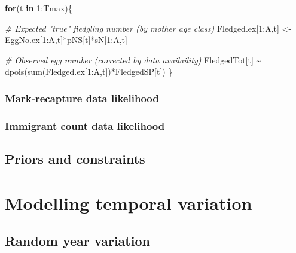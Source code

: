 \documentclass[
]{book}
\newenvironment{Shaded}{\begin{snugshade}}{\end{snugshade}}
\newcommand{\CommentTok}[1]{\textcolor[rgb]{0.56,0.35,0.01}{\textit{#1}}}
\newcommand{\ControlFlowTok}[1]{\textcolor[rgb]{0.13,0.29,0.53}{\textbf{#1}}}
\newcommand{\DecValTok}[1]{\textcolor[rgb]{0.00,0.00,0.81}{#1}}
\newcommand{\FunctionTok}[1]{\textcolor[rgb]{0.00,0.00,0.00}{#1}}
\newcommand{\NormalTok}[1]{#1}
\newcommand{\OtherTok}[1]{\textcolor[rgb]{0.56,0.35,0.01}{#1}}
\newcommand{\SpecialCharTok}[1]{\textcolor[rgb]{0.00,0.00,0.00}{#1}}
\begin{document}
\begin{Shaded}
\begin{Highlighting}[]
\ControlFlowTok{for}\NormalTok{(t }\ControlFlowTok{in} \DecValTok{1}\SpecialCharTok{:}\NormalTok{Tmax)\{}

    \CommentTok{\# Expected "true" fledgling number (by mother age class)}
\NormalTok{    Fledged.ex[}\DecValTok{1}\SpecialCharTok{:}\NormalTok{A,t] }\OtherTok{\textless{}{-}}\NormalTok{ EggNo.ex[}\DecValTok{1}\SpecialCharTok{:}\NormalTok{A,t]}\SpecialCharTok{*}\NormalTok{pNS[t]}\SpecialCharTok{*}\NormalTok{sN[}\DecValTok{1}\SpecialCharTok{:}\NormalTok{A,t]}

    \CommentTok{\# Observed egg number (corrected by data availaility)}
\NormalTok{    FledgedTot[t] }\SpecialCharTok{\textasciitilde{}} \FunctionTok{dpois}\NormalTok{(}\FunctionTok{sum}\NormalTok{(Fledged.ex[}\DecValTok{1}\SpecialCharTok{:}\NormalTok{A,t])}\SpecialCharTok{*}\NormalTok{FledgedSP[t])}
\NormalTok{\}}
\end{Highlighting}
\end{Shaded}

\hypertarget{mark-recapture-data-likelihood}{%
\subsection{Mark-recapture data likelihood}\label{mark-recapture-data-likelihood}}

\hypertarget{immigrant-count-data-likelihood}{%
\subsection{Immigrant count data likelihood}\label{immigrant-count-data-likelihood}}

\hypertarget{priors-and-constraints}{%
\section{Priors and constraints}\label{priors-and-constraints}}

\hypertarget{TempVar}{%
\chapter{Modelling temporal variation}\label{TempVar}}

\hypertarget{random-year-variation}{%
\section{Random year variation}\label{random-year-variation}}
\end{document}
